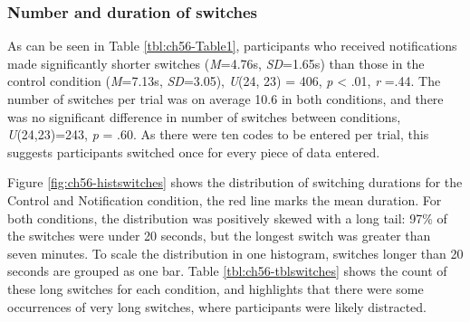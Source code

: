 \subsubsection{Number and duration of switches}
As can be seen in Table \ref{tbl:ch56-Table1}, participants who received notifications made significantly shorter switches (\textit{M}=4.76s, \textit{SD}=1.65s) than those in the control condition (\textit{M}=7.13s, \textit{SD}=3.05), \textit{U}(24, 23) = 406, \textit{p} < .01, \textit{r} =.44. The number of switches per trial was on average 10.6 in both conditions, and there was no significant difference in number of switches between conditions, \textit{U}(24,23)=243, \textit{p} = .60. As there were ten codes to be entered per trial, this suggests participants switched once for every piece of data entered. 

Figure \ref{fig:ch56-histswitches} shows the distribution of switching durations for the Control and Notification condition, the red line marks the mean duration. For both conditions, the distribution was positively skewed with a long tail: 97\% of the switches were under 20 seconds, but the longest switch was greater than seven minutes. To scale the distribution in one histogram, switches longer than 20 seconds are grouped as one bar. Table \ref{tbl:ch56-tblswitches} shows the count of these long switches for each condition, and highlights that there were some occurrences of very long switches, where participants were likely distracted. 

